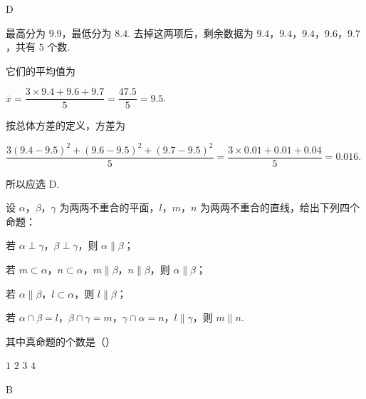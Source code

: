 \begin{answer}
D
\end{answer}

\begin{solution}
最高分为 \(9.9\)，最低分为 \(8.4\). 去掉这两项后，剩余数据为 \(9.4\)，\(9.4\)，\(9.4\)，\(9.6\)，\(9.7\)，共有 \(5\) 个数.

它们的平均值为

\(\overline{x}=\dfrac{3\times9.4+9.6+9.7}{5}=\dfrac{47.5}{5}=9.5\).

按总体方差的定义，方差为

\(\dfrac{3(9.4-9.5)^2+(9.6-9.5)^2+(9.7-9.5)^2}{5}=\dfrac{3\times0.01+0.01+0.04}{5}=0.016\).

所以应选 D.
\end{solution}

\begin{problem}
设 \(\alpha\)，\(\beta\)，\(\gamma\) 为两两不重合的平面，\(l\)，\(m\)，\(n\) 为两两不重合的直线，给出下列四个命题：
\begin{circlelist}
\item 若 \(\alpha \perp \gamma\)，\(\beta \perp \gamma\)，则 \(\alpha \parallel \beta\)；
\item 若 \(m \subset \alpha\)，\(n \subset \alpha\)，\(m \parallel \beta\)，\(n \parallel \beta\)，则 \(\alpha \parallel \beta\)；
\item 若 \(\alpha \parallel \beta\)，\(l \subset \alpha\)，则 \(l \parallel \beta\)；
\item 若 \(\alpha \cap \beta = l\)，\(\beta \cap \gamma = m\)，\(\gamma \cap \alpha = n\)，\(l \parallel \gamma\)，则 \(m \parallel n\).
\end{circlelist}
其中真命题的个数是（\quad）

\choices
    {\(1\)}
    {\(2\)}
    {\(3\)}
    {\(4\)}
\end{problem}

\begin{answer}
B
\end{answer}

